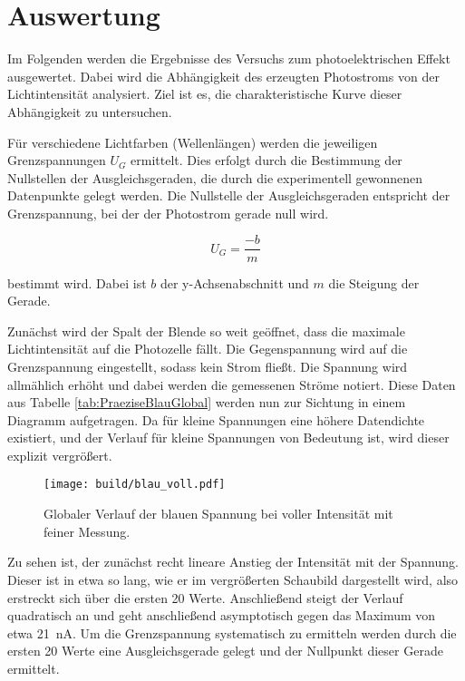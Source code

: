 %

%
\section{Auswertung}
\label{sec:Auswertung}

Im Folgenden werden die Ergebnisse des Versuchs zum photoelektrischen Effekt ausgewertet. Dabei wird die Abhängigkeit des erzeugten 
Photostroms von der Lichtintensität analysiert. Ziel ist es, die charakteristische Kurve dieser Abhängigkeit zu untersuchen.

Für verschiedene Lichtfarben (Wellenlängen) werden die jeweiligen Grenzspannungen $U_G$ ermittelt. Dies erfolgt durch die 
Bestimmung der Nullstellen der Ausgleichsgeraden, die durch die experimentell gewonnenen Datenpunkte gelegt werden. Die Nullstelle 
der Ausgleichsgeraden entspricht der Grenzspannung, bei der der Photostrom gerade null wird.

\begin{equation}
    U_G=\frac{-b}{m}
    \label{eqn:Nullstelle}
\end{equation}

\noindent bestimmt wird. Dabei ist $b$ der y-Achsenabschnitt und $m$ die Steigung der Gerade.

Zunächst wird der Spalt der Blende so weit geöffnet, dass die maximale Lichtintensität auf die Photozelle fällt. Die Gegenspannung 
wird auf die Grenzspannung eingestellt, sodass kein Strom fließt. Die Spannung wird allmählich erhöht und dabei werden die gemessenen 
Ströme notiert. Diese Daten aus Tabelle \ref{tab:PraeziseBlauGlobal} werden nun zur Sichtung in einem Diagramm aufgetragen. Da für 
kleine Spannungen eine höhere Datendichte existiert, und der Verlauf für kleine Spannungen von Bedeutung ist, wird dieser explizit 
vergrößert. 

\begin{figure}[H]
    \centering
    \texttt{[image: build/blau\_voll.pdf]}
    \caption{Globaler Verlauf der blauen Spannung bei voller Intensität mit feiner Messung.}
\end{figure}

\noindent Zu sehen ist, der zunächst recht lineare Anstieg der Intensität mit der Spannung. Dieser ist in etwa so lang, wie er im 
vergrößerten Schaubild dargestellt wird, also erstreckt sich über die ersten 20 Werte. Anschließend steigt der Verlauf quadratisch 
an und geht anschließend asymptotisch gegen das Maximum von etwa \qty{21}{\nano\ampere}. Um die Grenzspannung systematisch zu 
ermitteln werden durch die ersten 20 Werte eine Ausgleichsgerade gelegt und der Nullpunkt dieser Gerade ermittelt. 

